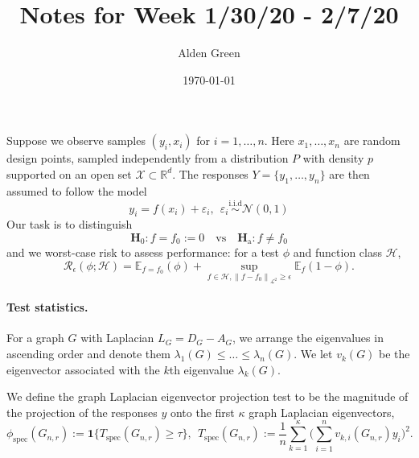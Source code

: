 \documentclass{article}
\newcommand{\Reals}{\mathbb{R}}
\newcommand{\norm}[1]{\left \lVert #1 \right \rVert}
\newcommand{\1}{\mathbf{1}}
\newcommand{\Rd}{\Reals^d}
\newcommand{\Xset}{\mathcal{X}}
\newcommand{\Leb}{\mathcal{L}}
\newcommand{\Ebb}{\mathbb{E}}
\newcommand{\spec}{\mathrm{spec}}
\theoremstyle{alden}
\theoremstyle{aldenthm}
\theoremstyle{definition}
\theoremstyle{remark}
\begin{document}
\title{Notes for Week 1/30/20 - 2/7/20}
\author{Alden Green}
\date{\today}
\maketitle

Suppose we observe samples $(y_i,x_i)$ for $i = 1,\ldots,n$. Here $x_1,\ldots,x_n$ are random design points, sampled independently from a distribution $P$ with density $p$ supported on an open set $\Xset \subset \Rd$. The responses $Y = \{y_1,\ldots,y_n\}$ are then assumed to follow the model
\begin{equation}
\label{eqn:regression_random_design_known_variance}
y_i = f(x_i) + \varepsilon_i, ~~ \varepsilon_i \overset{\textrm{i.i.d}}{\sim} \mathcal{N}(0,1)
\end{equation} 
Our task is to distinguish
\begin{equation*}
\mathbf{H}_0: f = f_0 := 0 \quad \textrm{vs} \quad \mathbf{H}_{\textrm{a}}: f \neq f_0
\end{equation*}
and we worst-case risk to assess performance: for a test $\phi$ and function class $\mathcal{H}$,
\begin{equation*}
\mathcal{R}_{\epsilon}(\phi; \mathcal{H}) = \Ebb_{f = f_0}(\phi) + \sup_{f \in \mathcal{H}, \norm{f - f_0}_{\Leb^2} \geq \epsilon} \Ebb_f(1 - \phi).
\end{equation*}

\paragraph{Test statistics.}

For a graph $G$ with Laplacian $L_G = D_G - A_G$, we arrange the eigenvalues in ascending order and denote them $\lambda_1(G) \leq \ldots \leq \lambda_n(G)$. We let $v_k(G)$ be the eigenvector associated with the $k$th eigenvalue $\lambda_k(G)$. 

We define the graph Laplacian eigenvector projection test to be the magnitude of the projection of the responses $y$ onto the first $\kappa$ graph Laplacian eigenvectors, 
\begin{equation*}
\phi_{\spec}(G_{n,r}) := \1\bigl\{T_{\textrm{spec}}(G_{n,r}) \geq \tau\bigr\},~~ T_{\textrm{spec}}(G_{n,r}) := \frac{1}{n}\sum_{k = 1}^{\kappa} \biggl(\sum_{i = 1}^{n} v_{k,i}(G_{n,r}) y_i\biggr)^2.
\end{equation*}
\end{document}
